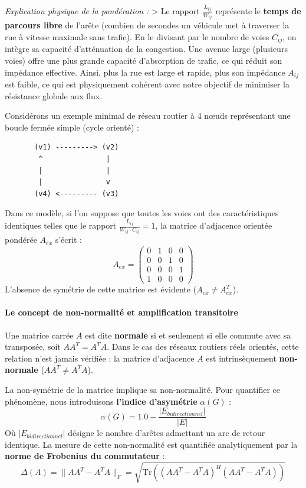 \documentclass[10pt, a4paper]{article}
\begin{document}
\emph{Explication physique de la pondération :} \textgreater{} Le
rapport \(\frac{L_{ij}}{W_{ij}}\) représente le \textbf{temps de
parcours libre} de l'arête (combien de secondes un véhicule met à
traverser la rue à vitesse maximale sans trafic). En le divisant par le
nombre de voies \(C_{ij}\), on intègre sa capacité d'atténuation de la
congestion. Une avenue large (plusieurs voies) offre une plus grande
capacité d'absorption de trafic, ce qui réduit son impédance effective.
Ainsi, plus la rue est large et rapide, plus son impédance \(A_{ij}\)
est faible, ce qui est physiquement cohérent avec notre objectif de
minimiser la résistance globale aux flux.

Considérons un exemple minimal de réseau routier à 4 nœuds représentant
une boucle fermée simple (cycle orienté) :

\begin{verbatim}
       (v1) ---------> (v2)
        ^               |
        |               |
        |               v
       (v4) <--------- (v3)
\end{verbatim}

Dans ce modèle, si l'on suppose que toutes les voies ont des
caractéristiques identiques telles que le rapport
\(\frac{L_{ij}}{W_{ij} \cdot C_{ij}} = 1\), la matrice d'adjacence
orientée pondérée \(A_{ex}\) s'écrit : \[A_{ex} = \begin{pmatrix}
0 & 1 & 0 & 0 \\
0 & 0 & 1 & 0 \\
0 & 0 & 0 & 1 \\
1 & 0 & 0 & 0
\end{pmatrix}\] L'absence de symétrie de cette matrice est évidente
(\(A_{ex} \neq A_{ex}^T\)).

\paragraph{Le concept de non-normalité et amplification
transitoire}\label{le-concept-de-non-normalituxe9-et-amplification-transitoire}

Une matrice carrée \(A\) est dite \textbf{normale} si et seulement si
elle commute avec sa transposée, soit \(A A^T = A^T A\). Dans le cas des
réseaux routiers réels orientés, cette relation n'est jamais vérifiée :
la matrice d'adjacence \(A\) est intrinsèquement \textbf{non-normale}
(\(A A^T \neq A^T A\)).

La non-symétrie de la matrice implique sa non-normalité. Pour quantifier
ce phénomène, nous introduisons \textbf{l'indice d'asymétrie}
\(\alpha(G)\) : \[\alpha(G) = 1.0 - \frac{|E_{bidirectionnel}|}{|E|}\]
Où \(|E_{bidirectionnel}|\) désigne le nombre d'arêtes admettant un arc
de retour identique. La mesure de cette non-normalité est quantifiée
analytiquement par la \textbf{norme de Frobenius du commutateur} :
\[\Delta(A) = \| A A^T - A^T A \|_F = \sqrt{\text{Tr}\left( (A A^T - A^T A)^H (A A^T - A^T A) \right)}\]
\end{document}
